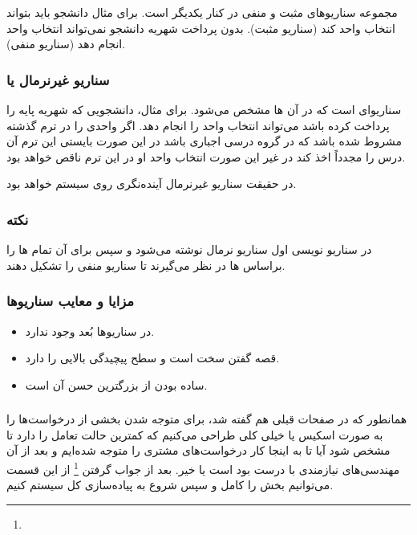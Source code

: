 مجموعه سناریو‌های مثبت و منفی در کنار یکدیگر است. برای مثال دانشجو باید بتواند
انتخاب واحد کند (سناریو مثبت). بدون پرداخت شهریه دانشجو نمی‌تواند انتخاب واحد
انجام دهد (سناریو منفی).

\subsubsection*{سناریو غیرنرمال یا }

سناریو‌ای است که در آن ها مشخص می‌شود. برای مثال، دانشجویی که
شهریه پایه را پرداخت کرده باشد می‌تواند انتخاب واحد را انجام دهد. اگر واحدی را
در ترم گذشته مشروط شده باشد که در گروه درسی اجباری باشد در این صورت بایستی این
ترم آن درس را مجدداً اخذ کند در غیر این صورت انتخاب واحد او در این ترم ناقص
خواهد بود.

در حقیقت سناریو غیرنرمال آینده‌نگری روی سیستم  خواهد بود.

\subsubsection*{نکته}

در سناریو نویسی اول سناریو نرمال نوشته می‌شود و سپس برای آن تمام
ها را براساس ها در نظر می‌گیرند تا سناریو منفی را
تشکیل دهند.

\subsubsection*{مزایا و معایب سناریو‌ها}

\begin{itemize}
    \item در سناریو‌ها بُعد  وجود ندارد.
    \item قصه گفتن سخت است و سطح پیچیدگی بالایی را دارد.
    \item ساده بودن از بزرگترین حسن آن است.
\end{itemize}

\subsubsection{}

همانطور که در صفحات قبلی هم گفته شد، برای متوجه شدن  بخشی از درخواست‌ها
را به صورت اسکیس یا  خیلی کلی طراحی می‌کنیم که کمترین حالت
تعامل را دارد تا مشخص شود آیا تا به اینجا کار درخواست‌های مشتری را متوجه شده‌ایم
و بعد از آن مهندسی‌های نیازمندی با درست بود است یا خیر. بعد از جواب گرفتن
\footnote{} از این قسمت می‌توانیم بخش  را کامل و سپس شروع به
پیاده‌سازی کل سیستم کنیم.

